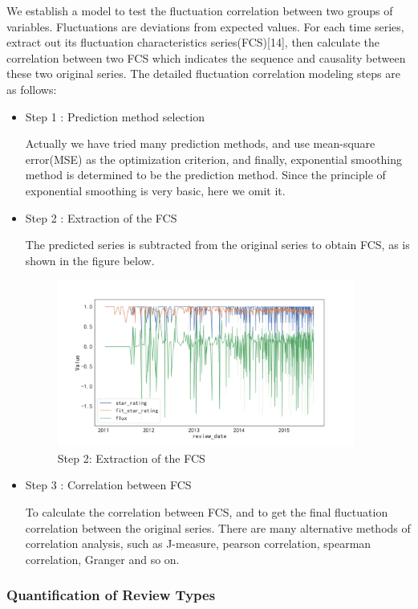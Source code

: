 \documentclass{mcmthesis}
\begin{document}
\quad \quad We establish a model to test the fluctuation correlation between two groups of variables. Fluctuations are deviations from expected values. For each time series, extract out its fluctuation characteristics series(FCS)[14], then calculate the correlation between two FCS which indicates the sequence and causality between these two original series. The detailed fluctuation correlation modeling steps are as follows:
\newpage
\begin{itemize}
\item  Step 1 : Prediction method selection

\quad \quad Actually we have tried many prediction methods, and use mean-square error(MSE) as the optimization criterion, and finally, exponential smoothing method is determined to be the prediction method. Since the principle of exponential smoothing is very basic, here we omit it.

\item  Step 2 : Extraction of the FCS

\quad \quad The predicted series is subtracted from the original series to obtain FCS, as is shown in the figure below.
\begin{figure}[H]
\centering
\includegraphics[width=.95\textwidth,height=5.5cm]{figures/f.png}
\caption{Step 2: Extraction of the FCS}
\end{figure}
\item  Step 3 : Correlation between FCS

\quad \quad To calculate the correlation between FCS, and to get the final fluctuation correlation between the original series. There are many alternative methods of correlation analysis, such as J-measure, pearson correlation, spearman correlation, Granger and so on.  

\end{itemize}

\subsubsection{Quantification of Review Types}
\end{document}
